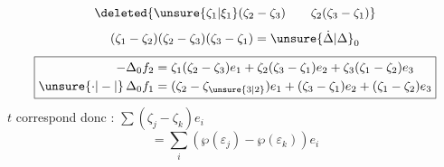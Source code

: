 \[
 \deleted{\unsure{\zeta_1|\xi_1}(\zeta_2-\zeta_3)\qquad\zeta_2(\zeta_3-\zeta_1)}
\]
\[
 (\zeta_1-\zeta_2)(\zeta_2-\zeta_3)(\zeta_3-\zeta_1)=\unsure{\dot\Delta|\Delta}_0
\]
\[
 \boxed{\begin{aligned}
 -\Delta_0f_2&=\zeta_1(\zeta_2-\zeta_3)e_1+\zeta_2(\zeta_3-\zeta_1)e_2+\zeta_3(\zeta_1-\zeta_2)e_3\\
 \unsure{\cdot|-|{}}\,\Delta_0 f_1&=(\zeta_2-\zeta_{\unsure{3|2}})e_1+(\zeta_3-\zeta_1)e_2+(\zeta_1-\zeta_2)e_3
 \end{aligned}}
\]
$t$ correspond donc : $\sum(\zeta_j-\zeta_k)e_i$
\[
 =\sum_i(\wp(\varepsilon_j)-\wp(\varepsilon_k))e_i
\]
